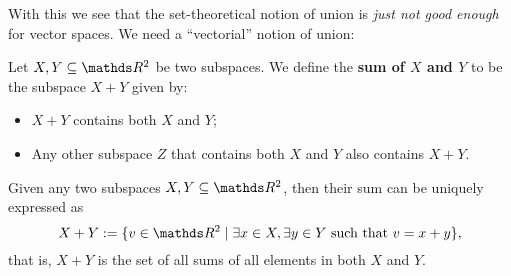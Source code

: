 With this we see that the set-theoretical notion of union is \textit{just not good enough} for vector spaces. We need a ``vectorial'' notion of union:

\begin{df}
	Let $X,Y\subseteq \R^2$ be two subspaces. We define the \textbf{sum of $X$ and $Y$} to be the subspace $X+Y$ given by:
	\begin{itemize}
		\item $X+Y$ contains both $X$ and $Y$;
		\item Any other subspace $Z$ that contains both $X$ and $Y$ also contains $X+Y$.
	\end{itemize}
\end{df}

\begin{prop}
	Given any two subspaces $X,Y\subseteq \R^2$, then their sum can be uniquely expressed as
	\[X+Y:=\{v\in \R^2\mid \exists x\in X,\exists y\in Y\mbox{ such that } v=x+y\},\]that is, $X+Y$ is the set of all sums of all elements in both $X$ and $Y$.
\end{prop}
